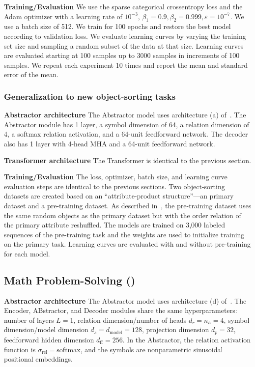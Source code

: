 \textbf{Training/Evaluation} We use the sparse categorical crossentropy loss and the Adam optimizer with a learning rate of $10^{-3}$, $\beta_1 = 0.9, \beta_2 = 0.999, \varepsilon = 10^{-7}$. We use a batch size of 512. We train for 100 epochs and restore the best model according to validation loss. We evaluate learning curves by varying the training set size and sampling a random subset of the data at that size. Learning curves are evaluated starting at 100 samples up to 3000 samples in increments of 100 samples. We repeat each experiment 10 times and report the mean and standard error of the mean.

\subsubsection{Generalization to new object-sorting tasks}

\textbf{Abstractor architecture} The Abstractor model uses architecture (a) of~. The Abstractor module has 1 layer, a symbol dimension of 64, a relation dimension of 4, a softmax relation activation, and a 64-unit feedforward network. The decoder also has 1 layer with 4-head MHA and a 64-unit feedforward network.

\textbf{Transformer architecture} The Transformer is identical to the previous section.

\textbf{Training/Evaluation} The loss, optimizer, batch size, and learning curve evaluation steps are identical to the previous sections. Two object-sorting datasets are created based on an ``attribute-product structure''---an primary dataset and a pre-training dataset. As described in~, the pre-training dataset uses the same random objects as the primary dataset but with the order relation of the primary attribute reshuffled. The models are trained on 3,000 labeled sequences of the pre-training task and the weights are used to initialize training on the primary task. Learning curves are evaluated with and without pre-training for each model.

\subsection{Math Problem-Solving ()}

\textbf{Abstractor architecture} The Abstractor model uses architecture (d) of~. The Encoder, ABstractor, and Decoder modules share the same hyperparameters: number of layers $L = 1$, relation dimension/number of heads $d_r = n_h = 4$, symbol dimension/model dimension $d_s = d_{\mathrm{model}} = 128$, projection dimension $d_p = 32$, feedforward hidden dimension $d_{\mathrm{ff}} = 256$. In the Abstractor, the relation activation function is $\sigma_{\mathrm{rel}} = \mathrm{softmax}$, and the symbols are nonparametric sinusoidal positional embeddings.


